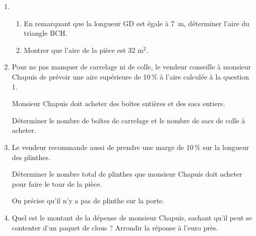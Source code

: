 \begin{enumerate}
\item 
	\begin{enumerate}
		\item En remarquant que la longueur GD est égale à 7~m, déterminer l'aire du triangle BCH.
		\item Montrer que l'aire de la pièce est 32 m$^2$.
	\end{enumerate}
\item Pour ne pas manquer de carrelage ni de colle, le vendeur conseille à monsieur Chapuis de prévoir une aire supérieure de 10\,\% à l'aire calculée à la question 1.
	
Monsieur Chapuis doit acheter des boîtes entières et des sacs entiers.
	
Déterminer le nombre de boîtes de carrelage et le nombre de sacs de colle à acheter.
\item Le vendeur recommande aussi de prendre une marge de 10\,\% sur la longueur des plinthes. 
	
Déterminer le nombre total de plinthes que monsieur Chapuis doit acheter pour faire le tour de la pièce. 
	
On précise qu'il n'y a pas de plinthe sur la porte.
\item Quel est le montant de la dépense de monsieur Chapuis, sachant qu'il peut se contenter d'un paquet de clous ? Arrondir la réponse à l'euro près.
\end{enumerate}

\vspace{0,5cm}

